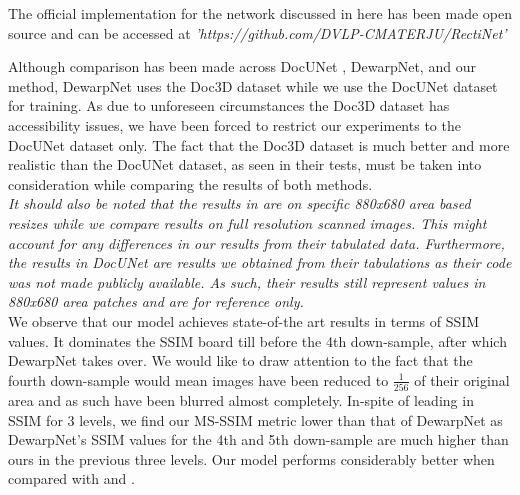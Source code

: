 \documentclass[a4paper,conference]{IEEEtran}
\begin{document}
	The official implementation for the network discussed in here has been made open source and can be accessed at \emph{'https://github.com/DVLP-CMATERJU/RectiNet'}
	
	
	
	Although comparison has been made across DocUNet \cite{Ma-CVPR18}, DewarpNet\cite{das2019dewarpnet}, and our method, DewarpNet uses the Doc3D dataset while we use the DocUNet dataset for training. As due to unforeseen circumstances the Doc3D dataset has accessibility issues, we have been forced to restrict our experiments to the DocUNet dataset only. The fact that the Doc3D dataset is much better and more realistic than the DocUNet dataset, as seen in their tests, must be taken into consideration while comparing the results of both methods. 
	\\
	
	\emph{It should also be noted that the results in \cite{das2019dewarpnet} are on specific 880x680 area based resizes while we compare results on full resolution scanned images. This might account for any differences in our  results from their tabulated data. Furthermore, the results in DocUNet\cite{Ma-CVPR18} are results we obtained from their tabulations as their code was not made publicly available. As such, their results still represent values in 880x680 area patches and are for reference only.}
	\\
	
	
	We observe that our model achieves state-of-the art results in terms of SSIM values. It dominates the SSIM board till before the 4th down-sample, after which DewarpNet takes over. We would like to draw attention to the fact that the fourth down-sample would mean images have been reduced to $\frac{1}{256}$ of their original area and as such have been blurred almost completely. In-spite of leading in SSIM for 3 levels, we find our MS-SSIM metric lower than that of DewarpNet as DewarpNet's SSIM values for the 4th and 5th down-sample are much higher than ours in the previous three levels. Our model performs considerably better when compared with \cite{Ma-CVPR18} and \cite{tian2011rectification}.
	
\end{document}
